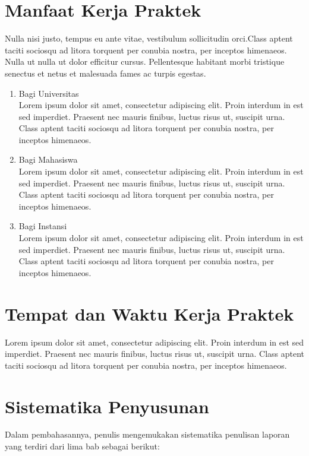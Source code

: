 \section{Manfaat Kerja Praktek}
Nulla nisi justo, tempus eu ante vitae, vestibulum sollicitudin orci.Class aptent taciti sociosqu ad litora torquent per conubia nostra, per inceptos himenaeos. Nulla ut nulla ut dolor efficitur cursus. Pellentesque habitant morbi tristique senectus et netus et malesuada fames ac turpis egestas.
\begin{enumerate}
    \item Bagi Universitas \\
          Lorem ipsum dolor sit amet, consectetur adipiscing elit. Proin interdum in est sed imperdiet. Praesent nec mauris finibus, luctus risus ut, suscipit urna. Class aptent taciti sociosqu ad litora torquent per conubia nostra, per inceptos himenaeos.
    \item Bagi Mahasiswa \\
          Lorem ipsum dolor sit amet, consectetur adipiscing elit. Proin interdum in est sed imperdiet. Praesent nec mauris finibus, luctus risus ut, suscipit urna. Class aptent taciti sociosqu ad litora torquent per conubia nostra, per inceptos himenaeos.
    \item Bagi Instansi \\
          Lorem ipsum dolor sit amet, consectetur adipiscing elit. Proin interdum in est sed imperdiet. Praesent nec mauris finibus, luctus risus ut, suscipit urna. Class aptent taciti sociosqu ad litora torquent per conubia nostra, per inceptos himenaeos.
\end{enumerate}

\section{Tempat dan Waktu Kerja Praktek}

Lorem ipsum dolor sit amet, consectetur adipiscing elit. Proin interdum in est sed imperdiet. Praesent nec mauris finibus, luctus risus ut, suscipit urna. Class aptent taciti sociosqu ad litora torquent per conubia nostra, per inceptos himenaeos.


\section{Sistematika Penyusunan}

Dalam pembahasannya, penulis mengemukakan sistematika penulisan laporan yang terdiri dari lima bab sebagai berikut:

